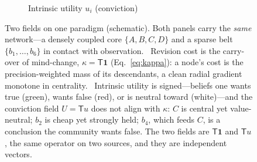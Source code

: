 \documentclass[runningheads]{llncs}
\newcommand{\Top}{\mathsf{T}}          %
\newcommand{\bone}{\mathbf{1}}         %
\begin{document}
\begin{figure}[h!]
\begin{subfigure}{0.49\textwidth}
\caption{Intrinsic utility $u_i$ (conviction)}
\label{sub:util}
\end{subfigure}
\caption{Two fields on one paradigm (schematic). Both panels carry the \emph{same} network---a densely
coupled core $\{A,B,C,D\}$ and a sparse belt $\{b_1,\dots,b_6\}$ in contact with observation.
~Revision cost is the carry-over of mind-change, $\kappa=\Top\bone$
(Eq.~\ref{eq:kappa}): a node's cost is the precision-weighted mass of its descendants, a clean radial
gradient monotone in centrality. ~Intrinsic utility is signed---beliefs one wants
true (green), wants false (red), or is neutral toward (white)---and the conviction field
$U=\Top u$ does not align with $\kappa$: $C$ is central yet value-neutral; $b_2$ is cheap yet strongly
held; $b_4$, which feeds $C$, is a conclusion the community wants false. The two fields are
$\Top\bone$ and $\Top u$, the same operator on two sources, and they are independent vectors.}
\label{fig:twofields}
\end{figure}
\end{document}
